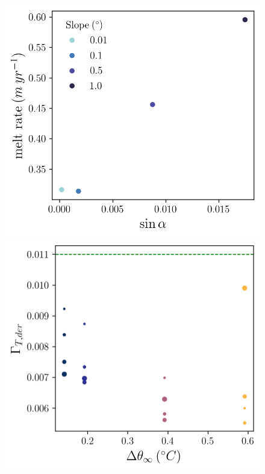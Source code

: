 \documentclass[draft]{agujournal2019}
\begin{document}
\begin{figure}[h!]
\begin{minipage}{0.5\textwidth}
        \includegraphics[trim={0 0 0 0},clip,width=\textwidth]{Figures/melt_slope_cmp_dslope_43h_tav13h.png}
    \end{minipage}
    \begin{minipage}{0.5\textwidth}
        \includegraphics[trim={0 0 0 0cm},clip,width=\textwidth]{Figures/gammaT_dT_cmp_dT_43h_tav13h.png}
    \end{minipage}%

\end{figure}
\end{document}
